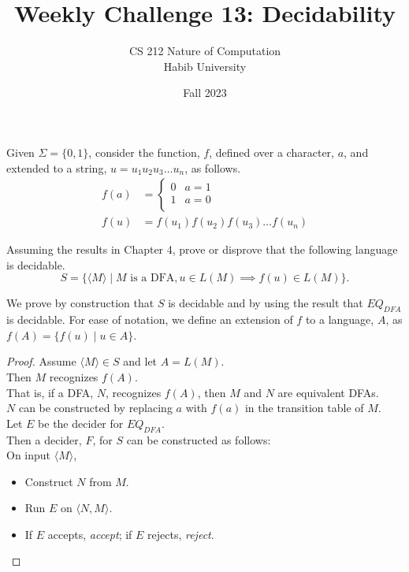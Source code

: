 \documentclass[a4paper]{exam}
\title{Weekly Challenge 13: Decidability}
\author{CS 212 Nature of Computation\\Habib University}
\date{Fall 2023}
\theoremstyle{theorem}
\theoremstyle{claim}
\begin{document}
\maketitle

\begin{questions}


  Given $\Sigma=\{0,1\}$, consider the function, $f$, defined over a character, $a$, and extended to a string, $u=u_1u_2u_3\ldots u_n$, as follows.
  \begin{align*}
    f(a) & =
           \begin{cases}
             0 & a = 1\\
             1 & a = 0\\
           \end{cases}\\
    f(u) & = f(u_1)f(u_2)f(u_3)\ldots f(u_n)
  \end{align*}

  Assuming the results in Chapter 4, prove or disprove that the following language is decidable.
\[
  S = \{\langle M\rangle \mid M\text{ is a DFA},  u\in L(M) \implies f(u)\in L(M)\}.
\]

\begin{solution}
  We prove by construction that $S$ is decidable and by using the result that $EQ_{DFA}$ is decidable. For ease of notation, we define an extension of $f$ to a language, $A$, as $f(A) = \{f(u) \mid u \in A\}$.
  \begin{proof}
    Assume $\langle M\rangle\in S$ and let $A = L(M)$.\\
    Then $M$ recognizes $f(A)$.\\
    That is, if a DFA, $N$, recognizes $f(A)$, then $M$ and $N$ are equivalent DFAs.\\
    $N$ can be constructed by replacing $a$ with $f(a)$ in the transition table of $M$.\\
    Let $E$ be the decider for $EQ_{DFA}$.\\
    Then a decider, $F$, for $S$ can be constructed as follows:\\
    On input $\langle M \rangle$,
    \begin{itemize}
    \item Construct $N$ from $M$.
    \item Run $E$ on $\langle N, M\rangle$.
    \item If $E$ accepts, \textit{accept}; if $E$ rejects, \textit{reject}.
    \end{itemize}
  \end{proof}
\end{solution}

\end{questions}
\end{document}
